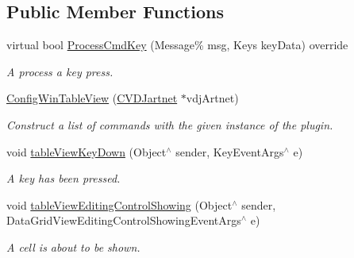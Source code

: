 \subsection*{Public Member Functions}
\begin{DoxyCompactItemize}
\item 
\mbox{\label{classConfigWinTableView_a12104b4ce88342f5c6e75d3aafc57535}} 
virtual bool \hyperlink{classConfigWinTableView_a12104b4ce88342f5c6e75d3aafc57535}{Process\+Cmd\+Key} (Message\% msg, Keys key\+Data) override
\begin{DoxyCompactList}\small\item\em A process a key press. \end{DoxyCompactList}\item 
\mbox{\label{classConfigWinTableView_a7b0abcafca070a2581de9d13fbcf7477}} 
\hyperlink{classConfigWinTableView_a7b0abcafca070a2581de9d13fbcf7477}{Config\+Win\+Table\+View} (\hyperlink{classCVDJartnet}{C\+V\+D\+Jartnet} $\ast$vdj\+Artnet)
\begin{DoxyCompactList}\small\item\em Construct a list of commands with the given instance of the plugin. \end{DoxyCompactList}\item 
\mbox{\label{classConfigWinTableView_a99ca2c9d181ad0370c156fb648ed3a0e}} 
void \hyperlink{classConfigWinTableView_a99ca2c9d181ad0370c156fb648ed3a0e}{table\+View\+Key\+Down} (Object$^\wedge$ sender, Key\+Event\+Args$^\wedge$ e)
\begin{DoxyCompactList}\small\item\em A key has been pressed. \end{DoxyCompactList}\item 
\mbox{\label{classConfigWinTableView_ad78543f2ff3cb851b0f591c9f0219b0c}} 
void \hyperlink{classConfigWinTableView_ad78543f2ff3cb851b0f591c9f0219b0c}{table\+View\+Editing\+Control\+Showing} (Object$^\wedge$ sender, Data\+Grid\+View\+Editing\+Control\+Showing\+Event\+Args$^\wedge$ e)
\begin{DoxyCompactList}\small\item\em A cell is about to be shown. \end{DoxyCompactList}\item 

\end{DoxyCompactItemize}
